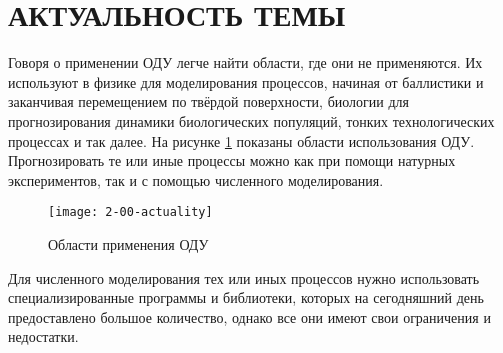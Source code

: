 \section{АКТУАЛЬНОСТЬ ТЕМЫ}

Говоря о применении ОДУ легче найти области, где они не применяются.
Их используют в физике для моделирования процессов, начиная от баллистики и заканчивая перемещением
по твёрдой поверхности, биологии для прогнозирования динамики биологических популяций, тонких технологических процессах и так далее.
На рисунке \ref{fig:actuality} показаны области использования ОДУ.
Прогнозировать те или иные процессы можно как при помощи натурных экспериментов, так и с помощью численного моделирования.

\begin{figure}
    \texttt{[image: 2-00-actuality]}
    \caption{Области применения ОДУ}
    \label{fig:actuality}
\end{figure}

Для численного моделирования тех или иных процессов нужно использовать специализированные программы и библиотеки, которых на
сегодняшний день предоставлено большое количество, однако все они имеют свои ограничения и недостатки.